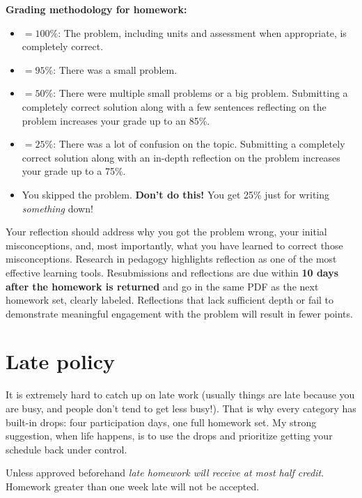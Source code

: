 \medskip
\textbf{Grading methodology for homework:}
\begin{itemize}
  \item[$\checkmark^{+}$] $= 100\%$: The problem, including units and assessment when
    appropriate, is completely correct.
  \item[$\checkmark$] $= 95\%$: There was a small problem.
  \item[$\checkmark^{-}$] $= 50\%$: There were multiple small problems or a big
    problem. Submitting a completely correct solution along with a few
    sentences reflecting on the problem increases your grade up to an
    85\%.
  \item[X] $= 25\%$: There was a lot of confusion on the topic.
    Submitting a completely correct solution along with an in-depth
    reflection on the problem increases your grade up to a 75\%.
  \item[$0$:] You skipped the problem. \textbf{Don't do this!} You get 25\% just
    for writing \emph{something} down!
\end{itemize}
Your reflection should address why you got the problem wrong, your initial
misconceptions, and, most importantly, what you have learned to correct those
misconceptions. Research in pedagogy highlights reflection as one of the most
effective learning tools. Resubmissions and reflections are due within
\textbf{10 days after the homework is returned} and go in the same PDF as the next homework set, clearly labeled. Reflections that lack
sufficient depth or fail to demonstrate meaningful engagement with the problem
will result in fewer points.

\section{Late policy}
%
It is extremely hard to catch up on late work (usually things are late
because you are busy, and people don't tend to get less busy!). That is
why every category has built-in drops: four participation days, one full
homework set. My strong suggestion, when life happens, is to use the
drops and prioritize getting your schedule back under control.

\medskip
Unless approved beforehand \emph{late homework will receive at most half
  credit}. Homework greater than one week late will not be accepted.

\bigskip

